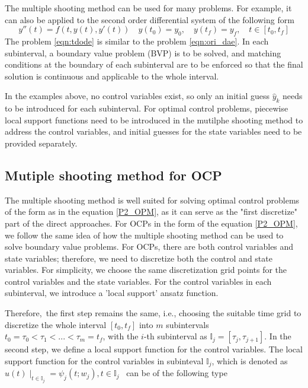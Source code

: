 \documentclass  [
  paper    = a4,
  BCOR     = 10mm,
  twoside,
  fontsize = 12pt,
  fleqn,
  toc      = bibnumbered,
  toc      = listofnumbered,
  numbers  = noendperiod,
  headings = normal,
  listof   = leveldown,
  version  = 3.03
]                                       {scrreprt}
\newcommand{\<}{\langle}
\renewcommand{\>}{\rangle}
\begin{document}
The multiple shooting method can be used for many problems. For example, it can also be applied to the second order differential system of the following form 
\begin{equation}
	y''(t) = f(t, y(t), y'(t))  \quad y(t_0) = y_0, \quad y(t_f) = y_f,  \quad t \in [t_0, t_f]
	\label{eqn:tdode}
\end{equation}
The problem \ref{eqn:tdode} is similar to the problem \ref{eqn:ori_dae}. In each subinterval, a boundary value problem (BVP) is to be solved, and matching conditions at the boundary of each subinterval are to be enforced so that the final solution is continuous and applicable to the whole interval.

In the examples above, no control variables exist, so only an initial guess $\hat{y}_k$ needs to be introduced for each subinterval. For optimal control problems, piecewise local support functions need to be introduced in the mutilphe shooting method to address the control variables, and initial guesses for the state variables need to be provided separately.

\subsection{Mutiple shooting method for OCP}
\label{Sec_MS_OCP}
The multiple shooting method is well suited for solving optimal control problems of the form as in the equation \ref{P2_OPM}, as it can serve as the "first discretize" part of the direct approaches. For OCPs in the form of the equation \ref{P2_OPM}, we follow the same idea of how the multiple shooting method can be used to solve boundary value problems. For OCPs, there are both control variables and state variables; therefore, we need to discretize both the control and state variables. For simplicity, we choose the same discretization grid points for the control variables and the state variables. For the control variables in each subinterval, we introduce a 'local support' ansatz function. 

Therefore, the first step remains the same, i.e., choosing the suitable time grid to discretize the whole interval $[t_0, t_f]$ into $m$ subintervals $t_0 = \tau_0 < \tau_1 < ... < \tau_m = t_f$, with the $i$-th subinterval as $\mathbb{I}_j = [\tau_j, \tau_{j+1}]$. In the second step, we define a local support function for the control variables. The local support function for the control variables in subinteval $\mathbb{I}_j$, which is denoted as  $u(t) \mid_{t \in \mathbb{I}_j} = \psi_j(t;w_j), t \in \mathbb{I}_j$  can be of the following type
\end{document}
